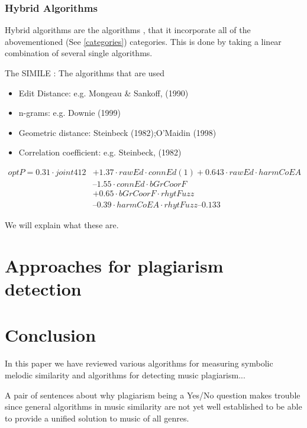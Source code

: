 \documentclass{article}
\begin{document}
			\newpage
			\subsubsection{Hybrid Algorithms}
				Hybrid algorithms are the algorithms , that it incorporate all of the abovementioned (See \ref{categories}) categories. This is done by taking a linear combination of several single algorithms.
 
				The SIMILE \cite{two_point_two}:
					The algorithms that are used 
						\begin{itemize}
							\item Edit Distance: e.g. Mongeau \& Sankoff, (1990)
							\item n-grams: e.g. Downie (1999)
							\item Geometric distance: Steinbeck (1982);O'Maidin (1998)
							\item Correlation coefficient: e.g. Steinbeck, (1982)
						\end{itemize}

					\begin{align*}
						optP = 0.31 \cdot joint412 &+ 1.37 \cdot rawEd \cdot connEd (1) + 0.643 \cdot rawEd \cdot harmCoEA\\
						&– 1.55\cdot connEd \cdot bGrCoorF\\
						&+ 0.65\cdot bGrCoorF\cdot rhytFuzz\\
						&– 0.39\cdot harmCoEA\cdot rhytFuzz – 0.133	
					\end{align*}

					We will explain what these are.




	\section{Approaches for plagiarism detection}
			

	\section*{Conclusion}

		In this paper we have reviewed various algorithms for measuring symbolic melodic similarity and algorithms for detecting music plagiarism...

		A pair of sentences about why plagiarism being a Yes/No question makes trouble since general algorithms in music similarity are not yet well established to be able to provide a unified solution to music of all genres.
\end{document}
